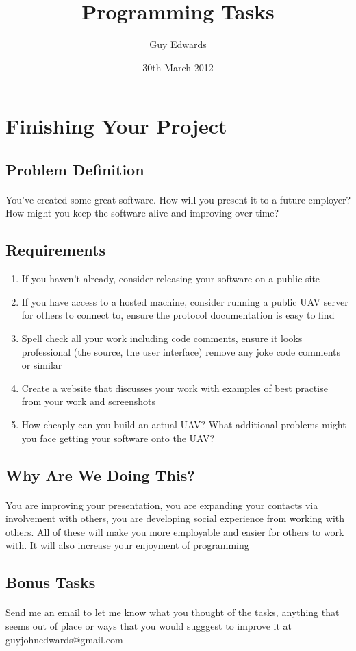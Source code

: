 \documentclass[11pt]{book}
\title{\textbf{Programming Tasks}}
\author{Guy Edwards}
\date{30th March 2012}
\begin{document}
\section{Finishing Your Project}

\subsection{Problem Definition}

\paragraph{} You've created some great software. How will you present it to a future employer? How might you keep the software alive and improving over time?

\subsection{Requirements}

\begin{enumerate}
\item If you haven't already, consider releasing your software on a public site
\item If you have access to a hosted machine, consider running a public UAV server for others to connect to, ensure the protocol documentation is easy to find
\item Spell check all your work including code comments, ensure it looks professional (the source, the user interface) remove any joke code comments or similar
\item Create a website that discusses your work with examples of best practise from your work and screenshots
\item How cheaply can you build an actual UAV? What additional problems might you face getting your software onto the UAV?
\end{enumerate}

\subsection{Why Are We Doing This?}

\paragraph{} You are improving your presentation, you are expanding your contacts via involvement with others, you are developing social experience from working with others. All of these will make you more employable and easier for others to work with. It will also increase your enjoyment of programming

\subsection{Bonus Tasks}

\paragraph{} Send me an email to let me know what you thought of the tasks, anything that seems out of place or ways that you would sugggest to improve it at guyjohnedwards@gmail.com
\end{document}
